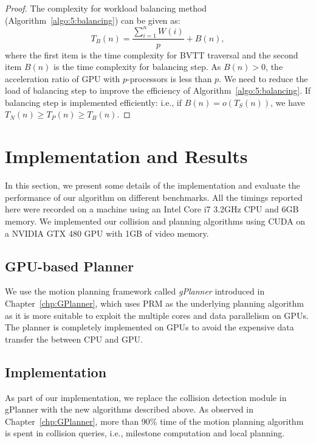 \begin{proof}
The complexity for workload balancing method (Algorithm~\ref{algo:5:balancing}) can be given as: $$T_B(n) = \frac{\sum_{i=1}^n W(i)}{p} + B(n),$$ where the first item is the time complexity for BVTT traversal and the second item $B(n)$ is the time complexity for balancing step. As $B(n) > 0$, the acceleration ratio of GPU with $p$-processors is less than $p$. We need to reduce the load of balancing step to improve the efficiency of Algorithm~\ref{algo:5:balancing}. If balancing step is implemented efficiently: i.e., if $B(n) = o(T_S(n))$, we have $T_N(n) \geq T_P(n) \geq T_B(n)$.
\end{proof}



\section{Implementation and Results}
\label{sec:5:result}


In this section, we present some details of the implementation and evaluate the performance of our algorithm
on different benchmarks. All the timings reported here were recorded on a machine using an Intel Core i7 3.2GHz CPU and 6GB
memory. We implemented our collision and planning algorithms using CUDA on a NVIDIA GTX 480 GPU with 1GB of video memory.

\subsection{GPU-based Planner}
We use the motion planning framework called \emph{gPlanner} introduced in Chapter~\ref{chp:GPlanner}, which uses PRM
as the underlying planning algorithm as it is more suitable to exploit the multiple cores and data parallelism on GPUs. The planner is completely implemented on GPUs to avoid the expensive data transfer the between CPU and GPU.


\subsection{Implementation}
As part of our implementation, we replace the collision detection module in gPlanner with the new algorithms described above.
As observed in Chapter~\ref{chp:GPlanner}, more than 90\% time of the motion planning algorithm is spent in collision queries, i.e., milestone computation and local planning.

